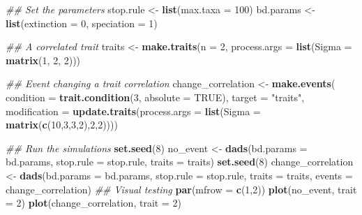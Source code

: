\documentclass[]{book}
\newenvironment{Shaded}{\begin{snugshade}}{\end{snugshade}}
\newcommand{\CommentTok}[1]{\textcolor[rgb]{0.56,0.35,0.01}{\textit{#1}}}
\newcommand{\DataTypeTok}[1]{\textcolor[rgb]{0.13,0.29,0.53}{#1}}
\newcommand{\DecValTok}[1]{\textcolor[rgb]{0.00,0.00,0.81}{#1}}
\newcommand{\KeywordTok}[1]{\textcolor[rgb]{0.13,0.29,0.53}{\textbf{#1}}}
\newcommand{\NormalTok}[1]{#1}
\newcommand{\OtherTok}[1]{\textcolor[rgb]{0.56,0.35,0.01}{#1}}
\newcommand{\StringTok}[1]{\textcolor[rgb]{0.31,0.60,0.02}{#1}}
\begin{document}
\begin{Shaded}
\begin{Highlighting}[]
\CommentTok{## Set the parameters}
\NormalTok{stop.rule <-}\StringTok{ }\KeywordTok{list}\NormalTok{(}\DataTypeTok{max.taxa =} \DecValTok{100}\NormalTok{)}
\NormalTok{bd.params <-}\StringTok{ }\KeywordTok{list}\NormalTok{(}\DataTypeTok{extinction =} \DecValTok{0}\NormalTok{, }\DataTypeTok{speciation =} \DecValTok{1}\NormalTok{)}

\CommentTok{## A correlated trait}
\NormalTok{traits <-}\StringTok{ }\KeywordTok{make.traits}\NormalTok{(}\DataTypeTok{n =} \DecValTok{2}\NormalTok{, }\DataTypeTok{process.args =} \KeywordTok{list}\NormalTok{(}\DataTypeTok{Sigma =} \KeywordTok{matrix}\NormalTok{(}\DecValTok{1}\NormalTok{, }\DecValTok{2}\NormalTok{, }\DecValTok{2}\NormalTok{)))}

\CommentTok{## Event changing a trait correlation}
\NormalTok{change_correlation <-}\StringTok{ }\KeywordTok{make.events}\NormalTok{(}
    \DataTypeTok{condition    =} \KeywordTok{trait.condition}\NormalTok{(}\DecValTok{3}\NormalTok{, }\DataTypeTok{absolute =} \OtherTok{TRUE}\NormalTok{),}
    \DataTypeTok{target       =} \StringTok{"traits"}\NormalTok{,}
    \DataTypeTok{modification =} \KeywordTok{update.traits}\NormalTok{(}\DataTypeTok{process.args =} \KeywordTok{list}\NormalTok{(}\DataTypeTok{Sigma =} \KeywordTok{matrix}\NormalTok{(}\KeywordTok{c}\NormalTok{(}\DecValTok{10}\NormalTok{,}\DecValTok{3}\NormalTok{,}\DecValTok{3}\NormalTok{,}\DecValTok{2}\NormalTok{),}\DecValTok{2}\NormalTok{,}\DecValTok{2}\NormalTok{))))}

\CommentTok{## Run the simulations}
\KeywordTok{set.seed}\NormalTok{(}\DecValTok{8}\NormalTok{)}
\NormalTok{no_event <-}\StringTok{ }\KeywordTok{dads}\NormalTok{(}\DataTypeTok{bd.params =}\NormalTok{ bd.params,}
                 \DataTypeTok{stop.rule =}\NormalTok{ stop.rule,}
                 \DataTypeTok{traits    =}\NormalTok{ traits)}
\KeywordTok{set.seed}\NormalTok{(}\DecValTok{8}\NormalTok{)}
\NormalTok{change_correlation <-}\StringTok{ }\KeywordTok{dads}\NormalTok{(}\DataTypeTok{bd.params =}\NormalTok{ bd.params,}
                           \DataTypeTok{stop.rule =}\NormalTok{ stop.rule,}
                           \DataTypeTok{traits    =}\NormalTok{ traits,}
                           \DataTypeTok{events    =}\NormalTok{ change_correlation)}
\CommentTok{## Visual testing}
\KeywordTok{par}\NormalTok{(}\DataTypeTok{mfrow =} \KeywordTok{c}\NormalTok{(}\DecValTok{1}\NormalTok{,}\DecValTok{2}\NormalTok{))}
\KeywordTok{plot}\NormalTok{(no_event, }\DataTypeTok{trait =} \DecValTok{2}\NormalTok{)}
\KeywordTok{plot}\NormalTok{(change_correlation, }\DataTypeTok{trait =} \DecValTok{2}\NormalTok{)}
\end{Highlighting}
\end{Shaded}
\end{document}
